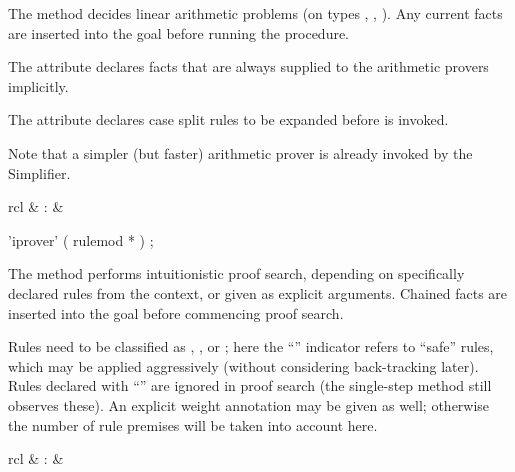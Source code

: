 \begin{isabellebody}
\begin{isamarkuptext}
  The \hyperlink{method.HOL.arith}{\mbox{}} method decides linear arithmetic problems
  (on types , , ).  Any current
  facts are inserted into the goal before running the procedure.

  The \hyperlink{attribute.HOL.arith}{\mbox{}} attribute declares facts that are
  always supplied to the arithmetic provers implicitly.

  The \hyperlink{attribute.HOL.arith-split}{\mbox{}} attribute declares case split
  rules to be expanded before \hyperlink{method.HOL.arith}{\mbox{}} is invoked.

  Note that a simpler (but faster) arithmetic prover is
  already invoked by the Simplifier.%
\end{isamarkuptext}%
\isamarkuptrue%
%
\isamarkuptrue%
%
\begin{isamarkuptext}%
\begin{matharray}{rcl}
    \hypertarget{method.HOL.iprover}{\hyperlink{method.HOL.iprover}{\mbox{}}} & : &  \\
  \end{matharray}

  \begin{rail}
    'iprover' ( rulemod * )
    ;
  \end{rail}

  The \hyperlink{method.HOL.iprover}{\mbox{}} method performs intuitionistic proof
  search, depending on specifically declared rules from the context,
  or given as explicit arguments.  Chained facts are inserted into the
  goal before commencing proof search.

  Rules need to be classified as \hyperlink{attribute.Pure.intro}{\mbox{}},
  \hyperlink{attribute.Pure.elim}{\mbox{}}, or \hyperlink{attribute.Pure.dest}{\mbox{}}; here the
  ``'' indicator refers to ``safe'' rules, which may be
  applied aggressively (without considering back-tracking later).
  Rules declared with ``'' are ignored in proof search (the
  single-step \hyperlink{method.rule}{\mbox{}} method still observes these).  An
  explicit weight annotation may be given as well; otherwise the
  number of rule premises will be taken into account here.%
\end{isamarkuptext}%
\isamarkuptrue%
%
\isamarkuptrue%
%
\begin{isamarkuptext}%
\begin{matharray}{rcl}
    \hypertarget{method.HOL.coherent}{\hyperlink{method.HOL.coherent}{\mbox{}}} & : &  \\
  \end{matharray}


\end{isamarkuptext}
\end{isabellebody}
